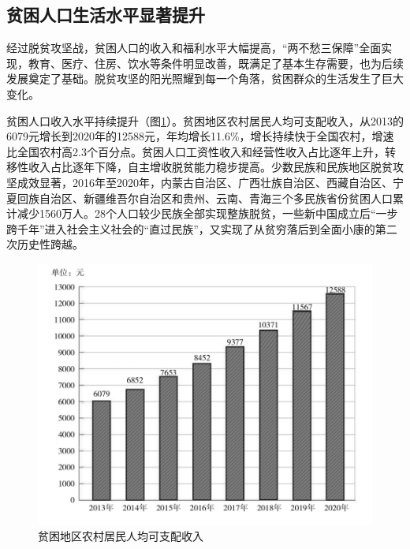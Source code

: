 \documentclass{ctexart}
\begin{document}
\subsection{贫困人口生活水平显著提升}

经过脱贫攻坚战，贫困人口的收入和福利水平大幅提高，“两不愁三保障”全面实现，教育、医疗、住房、饮水等条件明显改善，既满足了基本生存需要，也为后续发展奠定了基础。脱贫攻坚的阳光照耀到每一个角落，贫困群众的生活发生了巨大变化。

贫困人口收入水平持续提升（图\ref{fig-3}）。贫困地区农村居民人均可支配收入，从2013的6079元增长到2020年的12588元，年均增长11.6\%，增长持续快于全国农村，增速比全国农村高2.3个百分点。贫困人口工资性收入和经营性收入占比逐年上升，转移性收入占比逐年下降，自主增收脱贫能力稳步提高。少数民族和民族地区脱贫攻坚成效显著，2016年至2020年，内蒙古自治区、广西壮族自治区、西藏自治区、宁夏回族自治区、新疆维吾尔自治区和贵州、云南、青海三个多民族省份贫困人口累计减少1560万人。28个人口较少民族全部实现整族脱贫，一些新中国成立后“一步跨千年”进入社会主义社会的“直过民族”，又实现了从贫穷落后到全面小康的第二次历史性跨越。

\begin{figure}[h]
    \centering
    \includegraphics{fig/3.jpg}
    \caption{贫困地区农村居民人均可支配收入}
    \label{fig-3}
\end{figure}
\end{document}
